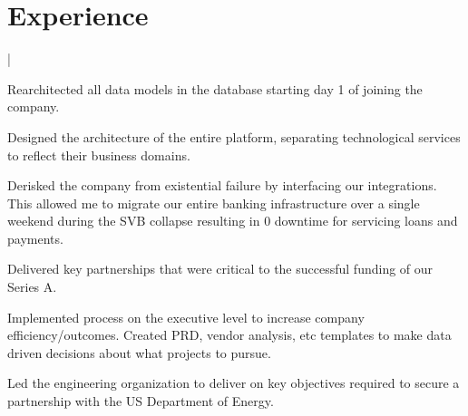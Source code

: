 \documentclass[letterpaper]{deedy-resume}
\begin{document}
\hfill
%
%
\begin{minipage}[t]{0.68\textwidth} 



\section{Experience}
 |
\vspace{\topsep}
\begin{tightitemize}
\item Rearchitected all data models in the database starting day 1 of joining the company. \\
\item Designed the architecture of the entire platform, separating technological services to reflect their business domains. \\
\item Derisked the company from existential failure by interfacing our integrations. This allowed me to migrate our entire banking infrastructure over a single weekend during the SVB collapse resulting in 0 downtime for servicing loans and payments. \\
\item Delivered key partnerships that were critical to the successful funding of our Series A. \\
\item Implemented process on the executive level to increase company efficiency/outcomes. Created PRD, vendor analysis, etc templates to make data driven decisions about what projects to pursue. \\
\item Led the engineering organization to deliver on key objectives required to secure a partnership with the US Department of Energy. \\

\end{tightitemize}
\sectionspace 


\end{minipage}
\end{document}
